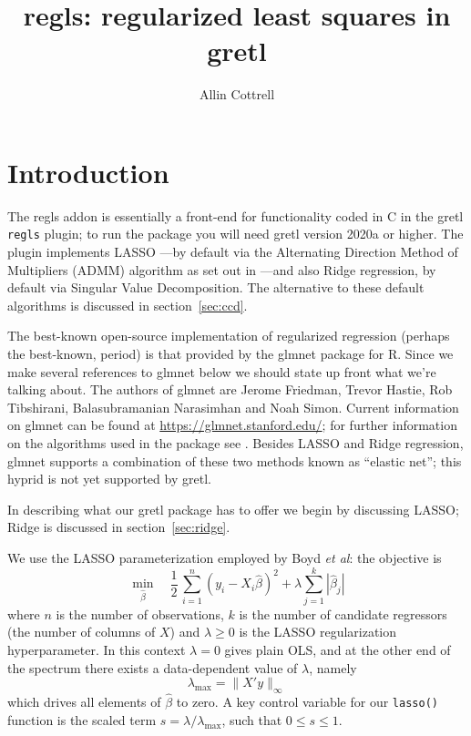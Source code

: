 \documentclass{article}
\title{regls: regularized least squares in gretl}
\author{Allin Cottrell}
\begin{document}
\maketitle

\section{Introduction}
\label{sec:intro}

The \textsf{regls} addon is essentially a front-end for functionality
coded in C in the gretl \texttt{regls} plugin; to run the package you
will need gretl version 2020a or higher.  The plugin implements LASSO
\citep{tibshirani96}---by default via the Alternating Direction Method
of Multipliers (ADMM) algorithm as set out in \cite{boyd2010}---and
also Ridge regression, by default via Singular Value Decomposition.
The alternative to these default algorithms is discussed in
section~\ref{sec:ccd}.

The best-known open-source implementation of regularized regression
(perhaps the best-known, period) is that provided by the
\textsf{glmnet} package for \textsf{R}. Since we make several
references to \textsf{glmnet} below we should state up front what
we're talking about. The authors of \textsf{glmnet} are Jerome
Friedman, Trevor Hastie, Rob Tibshirani, Balasubramanian Narasimhan
and Noah Simon. Current information on \textsf{glmnet} can be found at
\url{https://glmnet.stanford.edu/}; for further information on the
algorithms used in the package see \cite{glmnet10}. Besides LASSO and
Ridge regression, \textsf{glmnet} supports a combination of these two
methods known as ``elastic net''; this hyprid is not yet supported by
gretl.

In describing what our gretl package has to offer we begin by
discussing LASSO; Ridge is discussed in section~\ref{sec:ridge}.

We use the LASSO parameterization employed by Boyd \textit{et al}: the
objective is
\begin{equation}
  \label{eq:obj}
  \min_{\hat{\beta}} \quad \frac{1}{2}\,
  \sum_{i=1}^n (y_i - X_i\hat{\beta})^2 + \lambda \sum_{j=1}^k |\hat{\beta}_j|
\end{equation}
where $n$ is the number of observations, $k$ is the number of
candidate regressors (the number of columns of $X$) and
$\lambda \geq 0$ is the LASSO regularization hyperparameter. In this
context $\lambda = 0$ gives plain OLS, and at the other end of the
spectrum there exists a data-dependent value of $\lambda$, namely
\begin{equation}
  \label{eq:lmax}
  \lambda_{\max} = \|X'y\|_{\infty}
\end{equation}
which drives all elements of $\hat{\beta}$ to zero.  A key control
variable for our \texttt{lasso()} function is the scaled term
$s = \lambda/\lambda_{\max}$, such that $0 \leq s \leq 1$.
\end{document}
